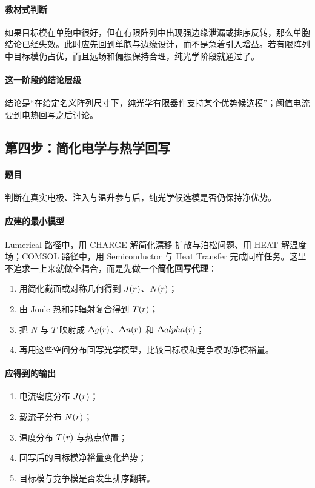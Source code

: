 \paragraph{教材式判断}
如果目标模在单胞中很好，但在有限阵列中出现强边缘泄漏或排序反转，那么单胞结论已经失效。此时应先回到单胞与边缘设计，而不是急着引入增益。若有限阵列中目标模仍占优，而且远场和偏振保持合理，纯光学阶段就通过了。

\paragraph{这一阶段的结论层级}
结论是“在给定名义阵列尺寸下，纯光学有限器件支持某个优势候选模”；阈值电流要到电热回写之后讨论。

\subsection{第四步：简化电学与热学回写}
\paragraph{题目} 判断在真实电极、注入与温升参与后，纯光学候选模是否仍保持净优势。

\paragraph{应建的最小模型}
Lumerical 路径中，用 CHARGE 解简化漂移-扩散与泊松问题、用 HEAT 解温度场；COMSOL 路径中，用 Semiconductor 与 Heat Transfer 完成同样任务。这里不追求一上来就做全耦合，而是先做一个\textbf{简化回写代理}：
\begin{enumerate}
  \item 用简化截面或对称几何得到 $J(r)$、$N(r)$；
  \item 由 Joule 热和非辐射复合得到 $T(r)$；
  \item 把 $N$ 与 $T$ 映射成 $\Delta g(r)$、$\Delta n(r)$ 和 $\Delta alpha(r)$；
  \item 再用这些空间分布回写光学模型，比较目标模和竞争模的净模裕量。
\end{enumerate}

\paragraph{应得到的输出}
\begin{enumerate}
  \item 电流密度分布 $J(r)$；
  \item 载流子分布 $N(r)$；
  \item 温度分布 $T(r)$ 与热点位置；
  \item 回写后的目标模净裕量变化趋势；
  \item 目标模与竞争模是否发生排序翻转。
\end{enumerate}

